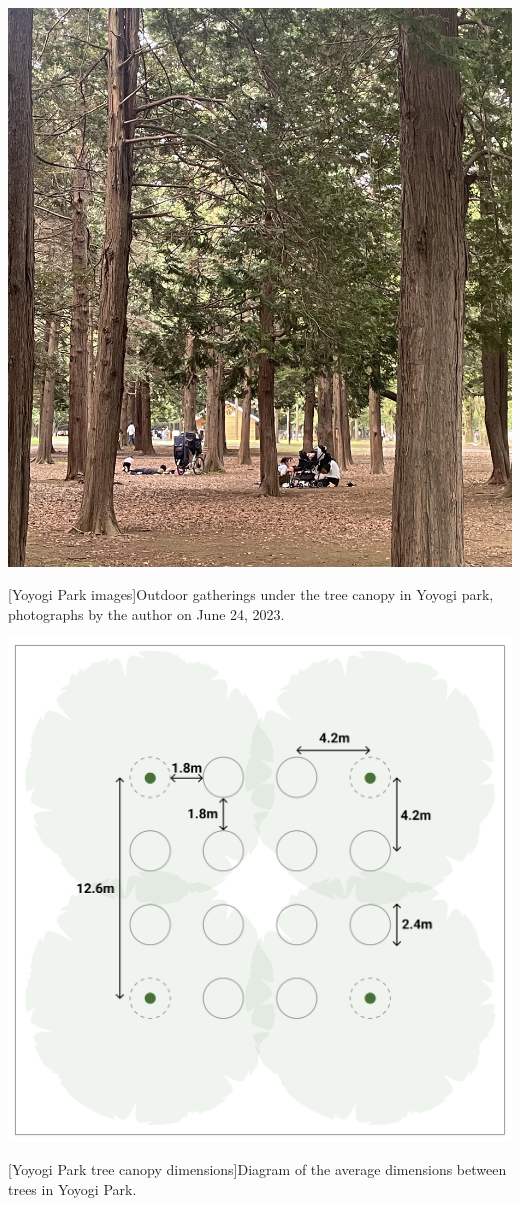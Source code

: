 \begin{multicols}{2}
\begin{minipage}{0.43\textwidth}
    \includegraphics[width=\linewidth]{images/gatherings/yoyogi_trees_image2.jpeg}\par{}[Yoyogi Park images]{Outdoor gatherings under the tree canopy in Yoyogi park, photographs by the author on June 24, 2023.}
    \label{fig:yoyogi_trees_images}\par\hspace{0.5pt}
    \includegraphics[width=\linewidth]{images/gatherings/yoyogi_trees.png}\par{}[Yoyogi Park tree canopy dimensions]{Diagram of the average dimensions between trees in Yoyogi Park.}
    \label{fig:yoyogi_trees}
\end{minipage}


\end{multicols}
